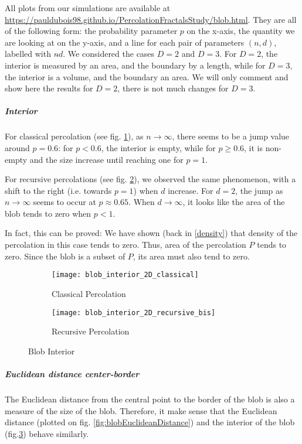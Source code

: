 All plots from our simulations are available at \url{https://pauldubois98.github.io/PercolationFractalsStudy/blob.html}.
They are all of the following form: the probability parameter $p$ on the x-axis, the quantity we are looking at on the y-axis, and a line for each pair of parameters $(n,d)$, labelled with $n \hat{} d$.
We considered the cases $D=2$ and $D=3$.
For $D=2$, the interior is measured by an area, and the boundary by a length, while for $D=3$, the interior is a volume, and the boundary an area.
We will only comment and show here the results for $D=2$, there is not much changes for $D=3$.

\subparagraph{Interior}
For classical percolation (see fig. \ref{fig:blobInteriorClassical}), as $n \to \infty$, there seems to be a jump value around $p=0.6$: for $p<0.6$, the interior is empty, while for $p \geq 0.6$, it is non-empty and the size increase until reaching one for $p=1$.

For recursive percolations (see fig. \ref{fig:blobInteriorRecursive}), we observed the same phenomenon, with a shift to the right (i.e. towards $p=1$) when $d$ increase.
For $d=2$, the jump as $n \to \infty$ seems to occur at $p \approx 0.65$.
When $d \to \infty$, it looks like the area of the blob tends to zero when $p<1$.

In fact, this can be proved:
We have shown (back in \ref{density}) that density of the percolation in this case tends to zero.
Thus, area of the percolation $P$ tends to zero.
Since the blob is a subset of $P$, its area must also tend to zero.

\begin{figure}[!h]
	\centering
	\begin{subfigure}{.49\textwidth}
		\texttt{[image: blob\_interior\_2D\_classical]}
		\centering
		\caption{Classical Percolation}
		\label{fig:blobInteriorClassical}
	\end{subfigure}
	\begin{subfigure}{.49\textwidth}
		\texttt{[image: blob\_interior\_2D\_recursive\_bis]}
		\centering
		\caption{Recursive Percolation}
		\label{fig:blobInteriorRecursive}
	\end{subfigure}
	\caption{Blob Interior}
	\label{fig:blobInterior}
\end{figure}


\subparagraph{Euclidean distance center-border}
The Euclidean distance from the central point to the border of the blob is also a measure of the size of the blob.
Therefore, it make sense that the Euclidean distance (plotted on fig. \ref{fig:blobEuclideanDistance}) and the interior of the blob (fig.\ref{fig:blobInterior}) behave similarly.

